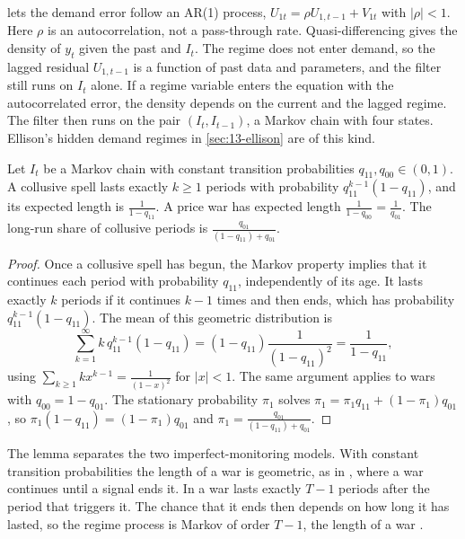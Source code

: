 \begin{remark}\label{rem:13-ar1}
 lets the demand error follow an AR(1) process, $U_{1t} = \rho U_{1,t-1} + V_{1t}$ with
$|\rho| < 1$. Here $\rho$ is an autocorrelation, not a pass-through rate. Quasi-differencing gives the density of
$y_t$ given the past and $I_t$. The regime does not enter demand, so the lagged residual $U_{1,t-1}$ is a function of
past data and parameters, and the filter still runs on $I_t$ alone. If a regime variable enters the equation with the
autocorrelated error, the density depends on the current and the lagged regime. The filter then runs on the pair
$(I_t, I_{t-1})$, a Markov chain with four states. Ellison's hidden demand regimes in \cref{sec:13-ellison} are of
this kind.
\end{remark}

\begin{lemma}\label{lem:13-durations}
Let $I_t$ be a Markov chain with constant transition probabilities $q_{11}, q_{00} \in (0,1)$. A collusive spell
lasts exactly $k \ge 1$ periods with probability $q_{11}^{k-1}(1 - q_{11})$, and its expected length is
$\frac{1}{1 - q_{11}}$. A price war has expected length $\frac{1}{1 - q_{00}} = \frac{1}{q_{01}}$. The long-run share
of collusive periods is $\frac{q_{01}}{(1 - q_{11}) + q_{01}}$.
\end{lemma}

\begin{proof}
Once a collusive spell has begun, the Markov property implies that it continues each period with probability
$q_{11}$, independently of its age. It lasts exactly $k$ periods if it continues $k - 1$ times and then ends, which
has probability $q_{11}^{k-1}(1 - q_{11})$. The mean of this geometric distribution is
\begin{equation*}
  \sum_{k=1}^{\infty} k\, q_{11}^{k-1}(1 - q_{11}) = (1 - q_{11})\frac{1}{(1 - q_{11})^2} = \frac{1}{1 - q_{11}},
\end{equation*}
using $\sum_{k\ge 1} k x^{k-1} = \frac{1}{(1-x)^2}$ for $|x| < 1$. The same argument applies to wars with
$q_{00} = 1 - q_{01}$. The stationary probability $\pi_1$ solves $\pi_1 = \pi_1 q_{11} + (1 - \pi_1)q_{01}$, so
$\pi_1(1 - q_{11}) = (1 - \pi_1)q_{01}$ and $\pi_1 = \frac{q_{01}}{(1 - q_{11}) + q_{01}}$.
\end{proof}

The lemma separates the two imperfect-monitoring models. With constant transition probabilities the length of a
war is geometric, as in \citet{AbreuPearceStacchetti1986}, where a war continues until a signal ends it. In
\citet{GreenPorter1984} a war lasts exactly $T-1$ periods after the period that triggers it. The chance that it ends
then depends on how long it has lasted, so the regime process is Markov of order $T-1$, the length of a war
\citep[p.~306]{Porter1983}.

